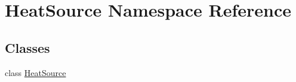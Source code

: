 \hypertarget{namespace_heat_source}{}\section{Heat\+Source Namespace Reference}
\label{namespace_heat_source}
\subsection*{Classes}
\begin{DoxyCompactItemize}
\item 
class \hyperlink{class_heat_source_1_1_heat_source}{Heat\+Source}
\end{DoxyCompactItemize}
